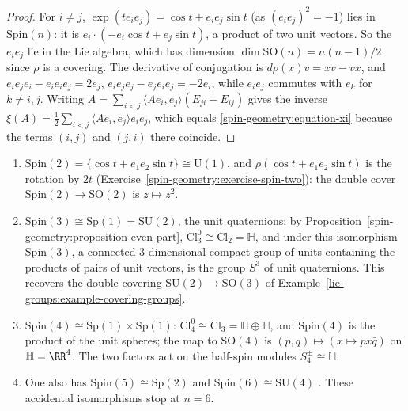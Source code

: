 \begin{proof}
For $i \neq j$, $\exp(te_ie_j) = \cos t + e_ie_j\sin t$ (as $(e_ie_j)^2 = -1$) lies in $\mathrm{Spin}(n)$: it is $e_i \cdot (-e_i\cos t + e_j\sin t)$, a product of two unit vectors. So the $e_ie_j$ lie in the Lie algebra, which has dimension $\dim\mathrm{SO}(n) = n(n-1)/2$ since $\rho$ is a covering. The derivative of conjugation is $d\rho(x)v = xv - vx$, and
$e_ie_je_i - e_ie_ie_j = 2e_j$, $e_ie_je_j - e_je_ie_j = -2e_i$, while $e_ie_j$ commutes with $e_k$ for $k \neq i, j$. Writing $A = \sum_{i<j}\langle Ae_i, e_j\rangle(E_{ji} - E_{ij})$ gives the inverse
$\xi(A) = \frac12\sum_{i<j}\langle Ae_i, e_j\rangle e_ie_j$, which equals \eqref{spin-geometry:equation-xi} because the terms $(i, j)$ and $(j, i)$ there coincide.
\end{proof}

\begin{example}\label{spin-geometry:example-low-dimensional-spin}
\begin{enumerate}
\item $\mathrm{Spin}(2) = \{\cos t + e_1e_2\sin t\} \cong \mathrm{U}(1)$, and $\rho(\cos t + e_1e_2\sin t)$ is the rotation by $2t$ (Exercise~\ref{spin-geometry:exercise-spin-two}): the double cover
$\mathrm{Spin}(2) \to \mathrm{SO}(2)$ is $z \mapsto z^2$.
\item $\mathrm{Spin}(3) \cong \mathrm{Sp}(1) = \mathrm{SU}(2)$, the unit quaternions: by Proposition~\ref{spin-geometry:proposition-even-part}, $\mathrm{Cl}_3^0 \cong \mathrm{Cl}_2 = \mathbb{H}$, and under this isomorphism $\mathrm{Spin}(3)$, a
connected $3$-dimensional compact group of units containing the products of pairs of unit vectors, is the group $S^3$ of unit quaternions. This recovers the double covering $\mathrm{SU}(2) \to \mathrm{SO}(3)$ of
Example~\ref{lie-groups:example-covering-groups}.
\item $\mathrm{Spin}(4) \cong \mathrm{Sp}(1) \times \mathrm{Sp}(1)$: $\mathrm{Cl}_4^0 \cong \mathrm{Cl}_3 = \mathbb{H} \oplus \mathbb{H}$, and $\mathrm{Spin}(4)$ is the product of the unit spheres; the map to $\mathrm{SO}(4)$ is
$(p, q) \mapsto (x \mapsto px\bar{q})$ on $\mathbb{H} = \RR^4$. The two factors act on the half-spin modules $S_4^\pm \cong \mathbb{H}$.
\item One also has $\mathrm{Spin}(5) \cong \mathrm{Sp}(2)$ and $\mathrm{Spin}(6) \cong \mathrm{SU}(4)$ \cite[Chapter I]{lawson-michelsohn}. These accidental isomorphisms stop at $n = 6$.
\end{enumerate}
\end{example}

